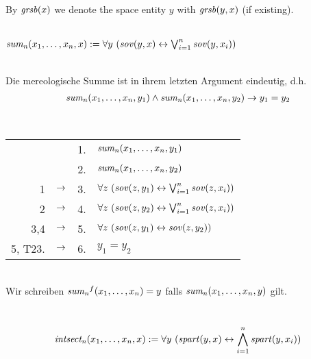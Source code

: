 \begin{konv}
    By $\mathit{gr\hspace*{-0.25ex}sb}(x)$ we denote the space entity $y$ with $\mathit{gr\hspace*{-0.25ex}sb}(y,x)$ (if existing).
\end{konv}



\begin{erin}\ \\
    $\Gsumn(x_{1},\ldots,x_{n},x) := \forall y\ (\Gsov(y,x) \leftrightarrow \bigvee^{n}_{i=1} \Gsov(y,x_{i}))$
\end{erin}

\begin{satz}\ \\
    Die mereologische Summe ist in ihrem letzten Argument eindeutig, d.h.
    \begin{align*}
        \mathit{sum_{n}}(x_{1},\ldots,x_{n},y_1) \land \mathit{sum_{n}}(x_{1},\ldots,x_{n},y_2) \to y_1 = y_2
    \end{align*}
\end{satz}

\begin{bew}\ \\
    \begin{longtable}{r c c l}
        & & 1. & $\mathit{sum_{n}}(x_{1},\ldots,x_{n},y_1)$\\
        & & 2. & $\mathit{sum_{n}}(x_{1},\ldots,x_{n},y_2)$\\
        1 & $\rightarrow$ & 3. & $\forall z\ (\Gsov(z,y_1) \leftrightarrow \bigvee^{n}_{i=1} \Gsov(z,x_{i}))$ \\
        2 & $\rightarrow$ & 4. & $\forall z\ (\Gsov(z,y_2) \leftrightarrow \bigvee^{n}_{i=1} \Gsov(z,x_{i}))$ \\
        3,4 & $\rightarrow$ & 5. & $\forall z\ (\Gsov(z,y_1) \leftrightarrow \Gsov(z,y_2))$ \\
        5, T23. & $\rightarrow$ & 6. & $y_1 = y_2$
    \end{longtable}
\end{bew}

\begin{konv}\ \\
    Wir schreiben $\mathit{sum_{n}}^f(x_{1},\ldots,x_{n}) = y$ falls $\mathit{sum_{n}}(x_{1},\ldots,x_{n},y)$ gilt.
\end{konv}


\begin{erin}\ \\
    \begin{align*}
        \mathit{intsect_{n}}(x_{1},\ldots,x_{n},x)  := \forall y\ (\mathit{spart}(y,x) \leftrightarrow \bigwedge^{n}_{i=1} \mathit{spart}(y,x_{i}))
    \end{align*}
\end{erin}

